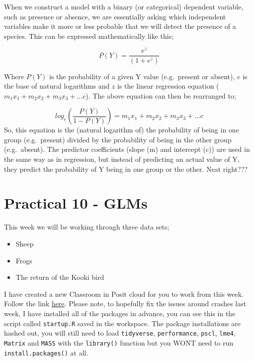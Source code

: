 \documentclass[
]{book}
\providecommand{\tightlist}{%
  \setlength{\itemsep}{0pt}\setlength{\parskip}{0pt}}
\begin{document}
When we construct a model with a binary (or categorical) dependent variable, such as presence or absence, we are essentially asking which independent variables make it more or less probable that we will detect the presence of a species. This can be expressed mathematically like this;

\[
P(Y) = \frac{e^z}{(1+e^z)}
\]

Where \(P(Y)\) is the probability of a given Y value (e.g.~present or absent), \(e\) is the base of natural logarithms and \(z\) is the linear regression equation (\(m_1x_1+m_2x_2+m_3x_3+...c\)). The above equation can then be rearranged to;

\[
log_e(\frac{P(Y)}{1-P(Y)}) = m_1x_1 + m_2x_2+m_3x_3 +... c
\]
So, this equation is the (natural logarithm of) the probability of being in one group (e.g.~present) divided by the probability of being in the other group (e.g.~absent). The predictor coefficients (slope (m) and intercept (c)) are used in the same way as in regression, but instead of predicting an actual value of Y, they predict the probability of Y being in one group or the other. Neat right???

\hypertarget{practical-10---glms}{%
\section{Practical 10 - GLMs}\label{practical-10---glms}}

This week we will be working through three data sets;

\begin{itemize}
\tightlist
\item
  Sheep
\item
  Frogs
\item
  The return of the Kooki bird
\end{itemize}

I have created a new Classroom in Posit cloud for you to work from this week. Follow the link \href{https://posit.cloud/spaces/451048/join?access_code=SiQlhHzulmeBkbO4NcMfueUek8iqroLUiJnPLxJU}{here}. Please note, to hopefully fix the issues around crashes last week, I have installed all of the packages in advance, you can see this in the script called \texttt{startup.R} saved in the workspace. The package installations are hashed out, you will still need to load \texttt{tidyverse}, \texttt{performance}, \texttt{pscl}, \texttt{lme4}, \texttt{Matrix} and \texttt{MASS} with the \texttt{library()} function but you WONT need to run \texttt{install.packages()} at all.
\end{document}
